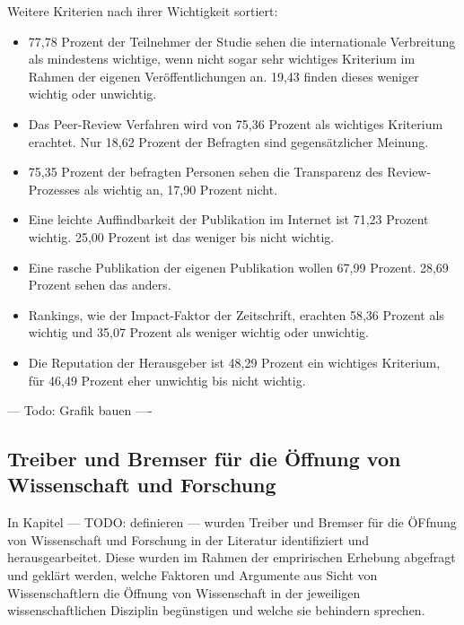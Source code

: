 Weitere Kriterien nach ihrer Wichtigkeit sortiert:
\begin{itemize}
\item 77,78 Prozent der Teilnehmer der Studie sehen die internationale Verbreitung als mindestens wichtige, wenn nicht sogar sehr wichtiges Kriterium im Rahmen der eigenen Veröffentlichungen an. 19,43 finden dieses weniger wichtig oder unwichtig.
\item Das Peer-Review Verfahren wird von 75,36 Prozent als wichtiges Kriterium erachtet. Nur 18,62 Prozent der Befragten sind gegensätzlicher Meinung.
\item 75,35 Prozent der befragten Personen sehen die Transparenz des Review-Prozesses als wichtig an, 17,90 Prozent nicht.
\item Eine leichte Auffindbarkeit der Publikation im Internet ist 71,23 Prozent wichtig. 25,00 Prozent ist das weniger bis nicht wichtig.
\item Eine rasche Publikation der eigenen Publikation wollen 67,99 Prozent. 28,69 Prozent sehen das anders.
\item Rankings, wie der Impact-Faktor der Zeitschrift, erachten 58,36 Prozent als wichtig und 35,07 Prozent als weniger wichtig oder unwichtig.
\item Die Reputation der Herausgeber ist 48,29 Prozent ein wichtiges Kriterium, für 46,49 Prozent eher unwichtig bis nicht wichtig.
\end{itemize}

--- Todo: Grafik bauen ----

\subsection{Treiber und Bremser für die Öffnung von Wissenschaft und Forschung}

In Kapitel --- TODO: definieren --- wurden Treiber und Bremser für die ÖFfnung von Wissenschaft und Forschung in der Literatur identifiziert und herausgearbeitet. Diese wurden im Rahmen der empririschen Erhebung abgefragt und geklärt werden, welche Faktoren und Argumente aus Sicht von Wissenschaftlern die Öffnung von Wissenschaft in der jeweiligen wissenschaftlichen Disziplin begünstigen und welche sie behindern sprechen. 

